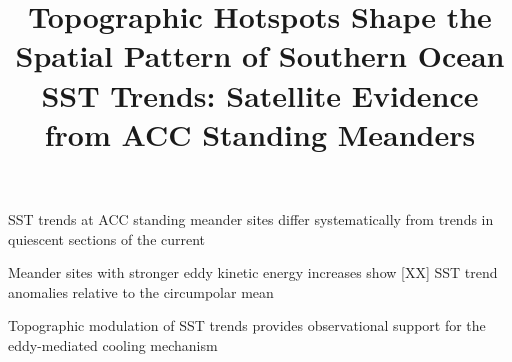 \documentclass[draft]{agujournal2019}
\begin{document}
\title{Topographic Hotspots Shape the Spatial Pattern of Southern Ocean SST Trends: Satellite Evidence from ACC Standing Meanders}









\begin{keypoints}

\item SST trends at ACC standing meander sites differ systematically from trends in quiescent sections of the current

\item Meander sites with stronger eddy kinetic energy increases show [XX] SST trend anomalies relative to the circumpolar mean

\item Topographic modulation of SST trends provides observational support for the eddy-mediated cooling mechanism

\end{keypoints}
\end{document}
